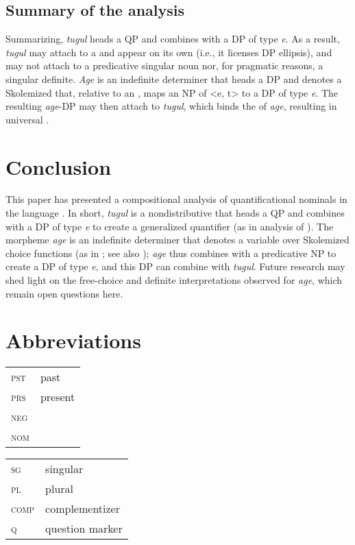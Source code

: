 \documentclass[output=paper]{LSP/langsci}
\begin{document}
\subsection{Summary of the analysis}
Summarizing, \textit{tugul} heads a QP and combines with a DP of type \textit{e}. As a result, \textit{tugul} may attach to a  and appear on its own (i.e., it licenses DP ellipsis), and may not attach to a predicative singular noun nor, for pragmatic reasons, a singular definite. \textit{Age} is an indefinite determiner that heads a DP and denotes a Skolemized  that, relative to an , maps an NP of <e, t> to a DP of type \textit{e}. The resulting \textit{age}-DP may then attach to \textit{tugul}, which binds the  of \textit{age}, resulting in universal .

\section{Conclusion} \label{sec:landman:conclusion}
This paper has presented a compositional analysis of quantificational nominals in the  language . In short, \textit{tugul} is a nondistributive  that heads a QP and combines with a DP of type \textit{e} to create a generalized quantifier (as in  analysis of ). The morpheme \textit{age} is an indefinite determiner that denotes a variable over Skolemized choice functions (as in \citealt{Kratzer:1998}; see also \citealt{Matthewson:1999,Matthewson:2001}); \textit{age} thus combines with a predicative NP to create a DP of type \textit{e}, and this DP can combine with \textit{tugul}. Future research may shed light on the free-choice and definite interpretations observed for \textit{age}, which remain open questions here.

\section*{Abbreviations}
\begin{tabularx}{.45\textwidth}{lQ}
\textsc{pst} & past \\
\textsc{prs} &present \\
\textsc{neg} &\\
\textsc{nom} &\\
\end{tabularx}
\begin{tabularx}{.45\textwidth}{lQ}
\textsc{sg}  &singular\\
\textsc{pl}  &plural\\
\textsc{comp}& complementizer\\
\textsc{q}   & question marker\\
\end{tabularx}
\end{document}
